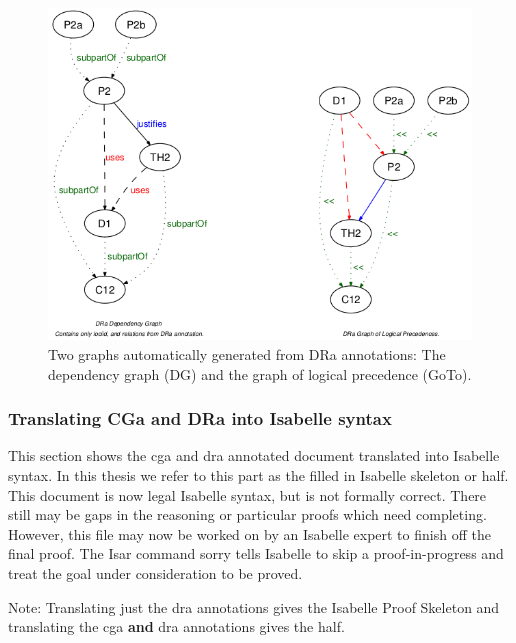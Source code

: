 \begin{figure}[H]
\begin{center}
\includegraphics[scale=0.6]{Figures/Background/depandgoto.png}
\end{center}
\caption{{Two graphs automatically generated from DRa annotations: The
dependency graph (DG) and the graph of logical precedence (GoTo)}.
 \label{fig:depandgoto}}
\end{figure}

\subsubsection{Translating CGa and DRa into Isabelle syntax}

This section shows the \gls{cga} and \gls{dra} annotated document translated
into Isabelle syntax. In this thesis we refer to this part as the filled in
Isabelle skeleton or \gls{half}. This document is now legal Isabelle syntax, but
is not formally correct. There still may be gaps in the reasoning or particular
proofs which need completing. However, this file may now be worked on by an
Isabelle expert to finish off the final proof. The Isar command sorry tells
Isabelle to skip a proof-in-progress and treat the goal under consideration to
be proved.

Note: Translating just the \gls{dra} annotations gives the Isabelle Proof
Skeleton and translating the \gls{cga} \textbf{and} \gls{dra} annotations gives
the \gls{half}.

